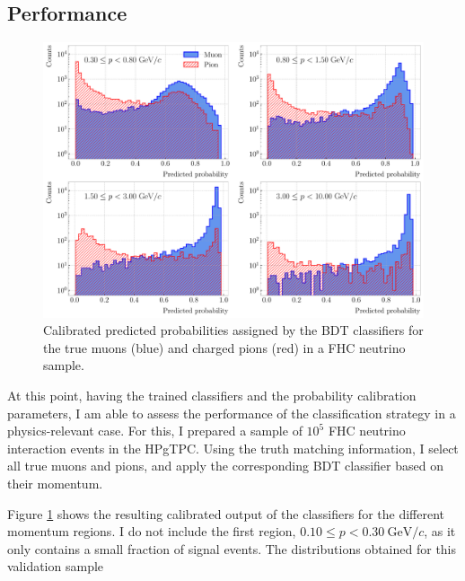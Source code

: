 \subsection{Performance}

\begin{figure}[t]
	\centering
	\includegraphics[width=.95\linewidth]{Images/GArSoft_PID/BDT/ecal_bdt_validation_output_regions.pdf}
	\caption[Calibrated predicted probabilities assigned by the BDT classifiers for the true muons and charged pions in a FHC neutrino sample.]{Calibrated predicted probabilities assigned by the BDT classifiers for the true muons (blue) and charged pions (red) in a FHC neutrino sample.}
	\label{fig:bdt_validation_output}
\end{figure}

At this point, having the trained classifiers and the probability calibration parameters, I am able to assess the performance of the classification strategy in a physics-relevant case. For this, I prepared a sample of $10^{5}$ FHC neutrino interaction events in the HPgTPC. Using the truth matching information, I select all true muons and pions, and apply the corresponding BDT classifier based on their momentum.

Figure \ref{fig:bdt_validation_output} shows the resulting calibrated output of the classifiers for the different momentum regions. I do not include the first region, $0.10 \leq p < 0.30 ~ \mathrm{GeV}/c$, as it only contains a small fraction of signal events. The distributions obtained for this validation sample 

